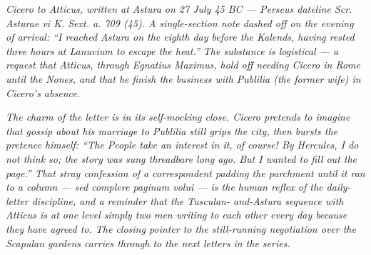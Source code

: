 
\textit{Cicero to Atticus, written at Astura on 27 July 45 BC ---
Perseus dateline \textit{Scr. Asturae vi K. Sext. a. 709 (45)}.
A single-section note dashed off on the evening of arrival: ``I
reached Astura on the eighth day before the Kalends, having
rested three hours at Lanuvium to escape the heat.'' The
substance is logistical --- a request that Atticus, through
Egnatius Maximus, hold off needing Cicero in Rome until the
Nones, and that he finish the business with Publilia (the
former wife) in Cicero's absence.}

\textit{The charm of the letter is in its self-mocking close.
Cicero pretends to imagine that gossip about his marriage to
Publilia still grips the city, then bursts the pretence himself:
``The People take an interest in it, of course! By Hercules, I
do not think so; the story was sung threadbare long ago. But I
wanted to fill out the page.'' That stray confession of a
correspondent padding the parchment until it ran to a column ---
\textit{sed complere paginam volui} --- is the human reflex of
the daily-letter discipline, and a reminder that the Tusculan-
and-Astura sequence with Atticus is at one level simply two men
writing to each other every day because they have agreed to.
The closing pointer to the still-running negotiation over the
Scapulan gardens carries through to the next letters in the
series.}
